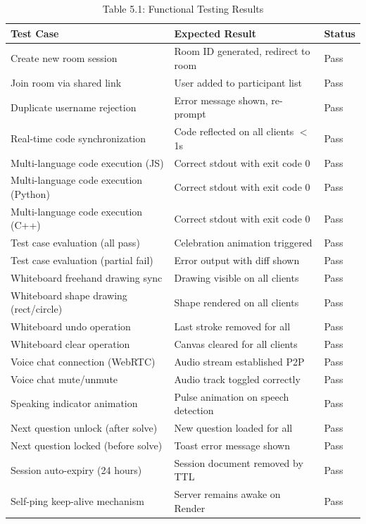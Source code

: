 \documentclass[12pt,a4paper,oneside]{report}
\newenvironment{reporttable}{%
  \small\singlespacing
}{%
  \doublespacing
}
\begin{document}
\begin{table}[H]
\centering
\caption{Table 5.1: Functional Testing Results}
\label{tab:testresults}
\begin{reporttable}
\begin{tabular}{@{} l l l @{}}
\toprule
\textbf{Test Case} & \textbf{Expected Result} & \textbf{Status} \\
\midrule
Create new room session & Room ID generated, redirect to room & Pass \\
Join room via shared link & User added to participant list & Pass \\
Duplicate username rejection & Error message shown, re-prompt & Pass \\
Real-time code synchronization & Code reflected on all clients $<$1s & Pass \\
Multi-language code execution (JS) & Correct stdout with exit code 0 & Pass \\
Multi-language code execution (Python) & Correct stdout with exit code 0 & Pass \\
Multi-language code execution (C++) & Correct stdout with exit code 0 & Pass \\
Test case evaluation (all pass) & Celebration animation triggered & Pass \\
Test case evaluation (partial fail) & Error output with diff shown & Pass \\
Whiteboard freehand drawing sync & Drawing visible on all clients & Pass \\
Whiteboard shape drawing (rect/circle) & Shape rendered on all clients & Pass \\
Whiteboard undo operation & Last stroke removed for all & Pass \\
Whiteboard clear operation & Canvas cleared for all clients & Pass \\
Voice chat connection (WebRTC) & Audio stream established P2P & Pass \\
Voice chat mute/unmute & Audio track toggled correctly & Pass \\
Speaking indicator animation & Pulse animation on speech detection & Pass \\
Next question unlock (after solve) & New question loaded for all & Pass \\
Next question locked (before solve) & Toast error message shown & Pass \\
Session auto-expiry (24 hours) & Session document removed by TTL & Pass \\
Self-ping keep-alive mechanism & Server remains awake on Render & Pass \\
\bottomrule
\end{tabular}
\end{reporttable}
\end{table}
\end{document}
